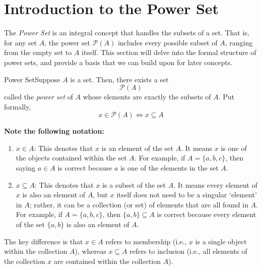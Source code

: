 \renewcommand{\theenumi}{\arabic{enumi}}
\renewcommand{\labelenumi}{\theenumi.}
\section{Introduction to the Power Set}

The \textit{Power Set} is an integral concept that handles the subsets of a set. That is, for any set \(A\), the power set \(\mathcal{P}(A)\) includes every possible subset of \(A\), ranging from the empty set to \(A\) itself. This section will delve into the formal structure of power sets, and provide a basis that we can build upon for later concepts.

\vspace{0.5cm}

\begin{axiom}
    {Power Set}Suppose \(A\) is a set. Then, there exists a set \[\mathcal{P}(A)\]
    called the \textit{power set} of \(A\) whose elements are exactly the subsets of \(A\). Put formally, \[x\in \mathcal{P}(A) \iff x\subseteq A\]
\end{axiom}

\begin{note}
    \textbf{Note the following notation:}

\begin{enumerate}
        
    \item \(x\in A\): This denotes that \(x\) is an element of the set \(A\). It means \(x\) is one of the objects contained within the set \(A\). For example, if \(A=\{a,b,c\}\), then saying \(a\in A\) is correct because \(a\) is one of the elements in the set \(A\).

    \item \(x\subseteq A\): This denotes that \(x\) is a subset of the set \(A\). It means every element of \(x\) is also an element of \(A\), but \(x\) itself does not need to be a singular `element' in \(A\); rather, it can be a collection (or set) of elements that are all found in \(A\). For example, if \(A=\{a,b,c\}\), then \(\{a,b\} \subseteq A\) is correct because every element of the set \(\{a,b\}\) is also an element of \(A\).
\end{enumerate}

The key difference is that \(x\in A\) refers to membership (i.e., \(x\) is a single object within the collection \(A\)), whereas \(x\subseteq A\) refers to inclusion (i.e., all elements of the collection \(x\) are contained within the collection \(A\)).
\end{note}

